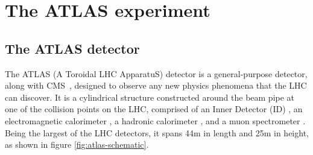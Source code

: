 \chapter{The ATLAS experiment}
\label{chap:ATLAS-detector}




\section{The ATLAS detector}
The ATLAS (A Toroidal LHC ApparatuS) \cite{atlas_exp_2008} detector is a general-purpose detector, along with CMS~\cite{The_CMS_Collaboration_2008}, designed to observe any new physics phenomena that the LHC can discover. 
It is a cylindrical structure constructed around the beam pipe at one of the collision points on the LHC, 
comprised of an Inner Detector (ID) \cite{ATLAS-TDR-04, ATLAS-TDR-05}, 
an electromagnetic calorimeter \cite{ATLAS-TDR-01, ATLAS-TDR-02}, 
a hadronic calorimeter \cite{ATLAS-TDR-03}, and a muon spectrometer \cite{ATLAS-TDR-10}. 
Being the largest of the LHC detectors, it spans 44m in length and 25m in height, as shown in figure \ref{fig:atlas-schematic}.

